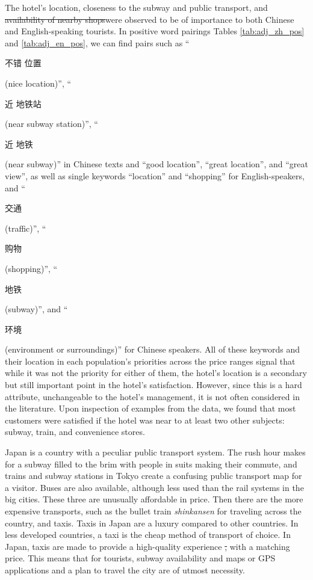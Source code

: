 \documentclass[smallextended,natbib]{svjour3}       %
\providecommand{\DIFadd}[1]{{\protect\color{blue}\uwave{#1}}} %
\providecommand{\DIFdel}[1]{{\protect\color{red}\sout{#1}}}                      %
\providecommand{\DIFaddbegin}{} %
\providecommand{\DIFaddend}{} %
\providecommand{\DIFdelbegin}{} %
\providecommand{\DIFdelend}{} %
\newcommand{\DIFscaledelfig}{0.5}
\newlength{\DIFdelgraphicswidth} %
\newlength{\DIFdelgraphicsheight} %
\newcommand{\DIFaddincludegraphics}[2][]{{\color{blue}\fbox{\DIFOincludegraphics[#1]{#2}}}} %
\newcommand{\DIFdelincludegraphics}[2][]{%
\sbox{\DIFdelgraphicsbox}{\DIFOincludegraphics[#1]{#2}}%
\settoboxwidth{\DIFdelgraphicswidth}{\DIFdelgraphicsbox} %
\settoboxtotalheight{\DIFdelgraphicsheight}{\DIFdelgraphicsbox} %
\scalebox{\DIFscaledelfig}{%
\parbox[b]{\DIFdelgraphicswidth}{\usebox{\DIFdelgraphicsbox}\\[-\baselineskip] \rule{\DIFdelgraphicswidth}{0em}}\llap{\resizebox{\DIFdelgraphicswidth}{\DIFdelgraphicsheight}{%
\setlength{\unitlength}{\DIFdelgraphicswidth}%
\begin{picture}(1,1)%
\thicklines\linethickness{2pt} %
{\color[rgb]{1,0,0}\put(0,0){\framebox(1,1){}}}%
{\color[rgb]{1,0,0}\put(0,0){\line( 1,1){1}}}%
{\color[rgb]{1,0,0}\put(0,1){\line(1,-1){1}}}%
\end{picture}%
}\hspace*{3pt}}} %
} %
\DeclareRobustCommand{\DIFaddbegin}{\DIFOaddbegin \let\includegraphics\DIFaddincludegraphics} %
\DeclareRobustCommand{\DIFaddend}{\DIFOaddend \let\includegraphics\DIFOincludegraphics} %
\DeclareRobustCommand{\DIFdelbegin}{\DIFOdelbegin \let\includegraphics\DIFdelincludegraphics} %
\DeclareRobustCommand{\DIFdelend}{\DIFOaddend \let\includegraphics\DIFOincludegraphics} %
\begin{document}
    The hotel's location, closeness to the subway and public transport, and \DIFdelbegin \DIFdel{availability of nearby shops}\DIFdelend \DIFaddbegin \DIFadd{nearby shops' availability }\DIFaddend were observed to be of importance to both Chinese and English-speaking tourists. In positive word pairings Tables \ref{tab:adj_zh_pos} and \ref{tab:adj_en_pos}, we can find pairs such as ``\begin{CJK}{UTF8}{gbsn}不错 位置\end{CJK} (nice location)'', ``\begin{CJK}{UTF8}{gbsn}近 地铁站\end{CJK} (near subway station)'', ``\begin{CJK}{UTF8}{gbsn}近 地铁\end{CJK} (near subway)'' in Chinese texts and ``good location'', ``great location'', and ``great view'', as well as single keywords ``location'' and ``shopping'' for English-speakers, and ``\begin{CJK}{UTF8}{gbsn}交通\end{CJK} (traffic)'', ``\begin{CJK}{UTF8}{gbsn}购物\end{CJK} (shopping)'', ``\begin{CJK}{UTF8}{gbsn}地铁\end{CJK} (subway)'', and ``\begin{CJK}{UTF8}{gbsn}环境\end{CJK} (environment or surroundings)'' for Chinese speakers. All of these keywords and their location in each population's priorities across the price ranges signal that while it was not the priority for either of them, the hotel's location is a secondary but still important point in the hotel's satisfaction. However, since this is a hard attribute, unchangeable to the hotel's management, it is not often considered in the literature. Upon inspection of examples from the data, we found that most customers were satisfied if the hotel was near to at least two other subjects: subway, train, and convenience stores. 

    Japan is a country with a peculiar public transport system. The rush hour makes for a subway filled to the brim with people in suits making their commute, and trains and subway stations in Tokyo create a confusing public transport map for a visitor. Buses are also available, although less used than the rail systems in the big cities. These three are unusually affordable in price. Then there are the more expensive transports, such as the bullet train \textit{shinkansen} for traveling across the country, and taxis. Taxis in Japan are a luxury compared to other countries. In less developed countries, a taxi is the cheap method of transport of choice. In Japan, taxis are made to provide a high-quality experience \DIFdelbegin \DIFdel{, }\DIFdelend with a matching price. This means that for tourists, subway availability and maps or GPS applications and a plan to travel the city are of utmost necessity. 
\end{document}

